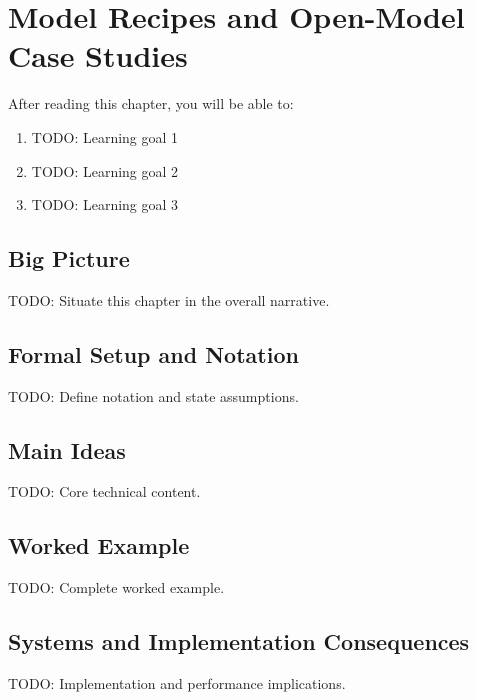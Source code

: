 \chapter{Model Recipes and Open-Model Case Studies}
\label{ch:20}

\begin{keyinsight}
After reading this chapter, you will be able to:
\begin{enumerate}
  \item TODO: Learning goal 1
  \item TODO: Learning goal 2
  \item TODO: Learning goal 3
\end{enumerate}
\end{keyinsight}

\section{Big Picture}
\label{ch:20:sec:big_picture}

TODO: Situate this chapter in the overall narrative.

\section{Formal Setup and Notation}
\label{ch:20:sec:setup}

TODO: Define notation and state assumptions.

\section{Main Ideas}
\label{ch:20:sec:main}

TODO: Core technical content.

\section{Worked Example}
\label{ch:20:sec:example}

TODO: Complete worked example.

\section{Systems and Implementation Consequences}
\label{ch:20:sec:systems}

TODO: Implementation and performance implications.

